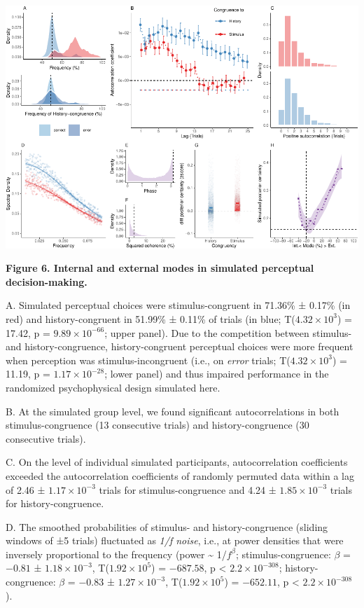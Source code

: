\documentclass[
]{article}
\begin{document}
\includegraphics{modes_mouse_files/figure-latex/Figure_6-1.pdf}

\textbf{Figure 6. Internal and external modes in simulated perceptual
decision-making.}

A. Simulated perceptual choices were stimulus-congruent in 71.36\% ±
0.17\% (in red) and history-congruent in 51.99\% ± 0.11\% of trials (in
blue; T(\ensuremath{4.32\times 10^{3}}) = 17.42, p =
\(\ensuremath{9.89\times 10^{-66}}\); upper panel). Due to the
competition between stimulus- and history-congruence, history-congruent
perceptual choices were more frequent when perception was
stimulus-incongruent (i.e., on \emph{error} trials;
T(\ensuremath{4.32\times 10^{3}}) = 11.19, p =
\(\ensuremath{1.17\times 10^{-28}}\); lower panel) and thus impaired
performance in the randomized psychophysical design simulated here.

B. At the simulated group level, we found significant autocorrelations
in both stimulus-congruence (13 consecutive trials) and
history-congruence (30 consecutive trials).

C. On the level of individual simulated participants, autocorrelation
coefficients exceeded the autocorrelation coefficients of randomly
permuted data within a lag of 2.46 ± \ensuremath{1.17\times 10^{-3}}
trials for stimulus-congruence and 4.24 ±
\ensuremath{1.85\times 10^{-3}} trials for history-congruence.

D. The smoothed probabilities of stimulus- and history-congruence
(sliding windows of ±5 trials) fluctuated as \emph{1/f noise}, i.e., at
power densities that were inversely proportional to the frequency (power
\textasciitilde{} 1/\(f^\beta\); stimulus-congruence: \(\beta\) =
\(-0.81\) ± \(\ensuremath{1.18\times 10^{-3}}\),
T(\(\ensuremath{1.92\times 10^{5}}\)) = \(-687.58\), p < \(\ensuremath{2.2\times 10^{-308}}\);
history-congruence: \(\beta\) = \(-0.83\) ±
\(\ensuremath{1.27\times 10^{-3}}\),
T(\(\ensuremath{1.92\times 10^{5}}\)) = \(-652.11\), p < \(\ensuremath{2.2\times 10^{-308}}\)).
\end{document}
